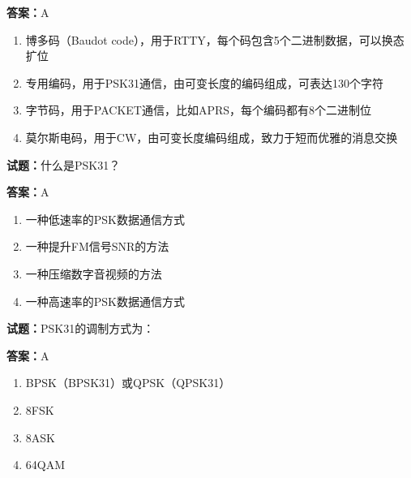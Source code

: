 \documentclass{ctexbook}
\begin{document}
\textbf{答案：}A 

\begin{enumerate}[leftmargin=3em]
  \item 博多码（Baudot code），用于RTTY，每个码包含5个二进制数据，可以换态扩位 

  \item 专用编码，用于PSK31通信，由可变长度的编码组成，可表达130个字符 

  \item 字节码，用于PACKET通信，比如APRS，每个编码都有8个二进制位 

  \item 莫尔斯电码，用于CW，由可变长度编码组成，致力于短而优雅的消息交换 

\end{enumerate}





\vspace{1em}

\textbf{试题：}什么是PSK31？ 

\textbf{答案：}A 

\begin{enumerate}[leftmargin=3em]
  \item 一种低速率的PSK数据通信方式 

  \item 一种提升FM信号SNR的方法 

  \item 一种压缩数字音视频的方法 

  \item 一种高速率的PSK数据通信方式 

\end{enumerate}





\vspace{1em}

\textbf{试题：}PSK31的调制方式为： 

\textbf{答案：}A 

\begin{enumerate}[leftmargin=3em]
  \item BPSK（BPSK31）或QPSK（QPSK31） 

  \item 8FSK 

  \item 8ASK 

  \item 64QAM 

\end{enumerate}
\end{document}
